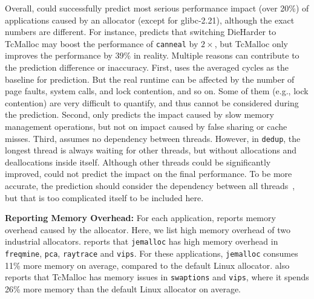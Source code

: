 Overall, \MP{} could successfully predict most serious performance impact (over 20\%) of  applications caused by an allocator (except  for glibc-2.21), although the exact numbers are different. For instance, \MP{} predicts that switching DieHarder to TcMalloc may boost the performance of \texttt{canneal} by $2\times$, but TcMalloc only improves the performance by 39\% in reality. Multiple reasons can contribute to the prediction difference or inaccuracy. First, \MP{} uses the averaged cycles as the baseline for prediction. But the real runtime can be affected by the number of page faults, system calls, and lock contention, and so on. Some of them (e.g., lock contention) are very difficult to quantify, and thus cannot be considered during the prediction. Second, \MP{} only predicts the impact caused by slow memory management operations, but not on impact caused by false sharing or cache misses. 
Third, \MP{} assumes no dependency between threads. However, in \texttt{dedup}, the longest thread is always waiting for other threads, but without allocations and deallocations inside itself. Although other threads could be significantly improved, \MP{} could not predict the impact on the final performance. To be more accurate, the prediction should consider the dependency between all threads~\cite{wPerf}, but that is too complicated itself to be included here.

\textbf{Reporting Memory Overhead:} 
For each application, \MP{} reports memory overhead caused by the allocator. Here, we list high memory overhead of two industrial allocators. \MP{} reports that \texttt{jemalloc} has high memory overhead in \texttt{freqmine}, \texttt{pca}, \texttt{raytrace} and \texttt{vips}. For these applications, \texttt{jemalloc} consumes 11\% more memory on average, compared to the default Linux allocator. \MP{} also reports that TcMalloc has memory issues in \texttt{swaptions} and \texttt{vips}, where it spends 26\% more memory than the default Linux allocator on average. 


